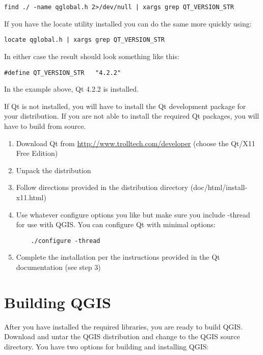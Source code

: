 \begin{verbatim}
find ./ -name qglobal.h 2>/dev/null | xargs grep QT_VERSION_STR
\end{verbatim}
  
If you have the locate utility installed you can do the same more quickly
using:

\begin{verbatim}
locate qglobal.h | xargs grep QT_VERSION_STR
\end{verbatim}
  
In either case the result should look something like this:

\begin{verbatim}
#define QT_VERSION_STR   "4.2.2"
\end{verbatim} 
	
In the example above, Qt 4.2.2 is installed.
   
If Qt is not installed, you will have to install the Qt development
package for your distribution. If you are not able to install the required
Qt packages, you will have to build from source.
 
  
\begin{enumerate}
\item Download Qt from \url{http://www.trolltech.com/developer} (choose
the Qt/X11 Free Edition)
\item Unpack the distribution
\item Follow directions provided in the distribution directory
(doc/html/install-x11.html)
\item Use whatever configure options you like but make sure you include
-thread for use with QGIS. You can configure Qt with minimal options:
\begin{verbatim}
	./configure -thread
\end{verbatim}
\item Complete the installation per the instructions provided in the Qt
documentation (see step 3)
\end{enumerate}

\section{Building QGIS}

After you have installed the required libraries, you are ready to build
QGIS. Download and untar the QGIS distribution and change to the QGIS
source directory. You have two options for building and installing QGIS:

